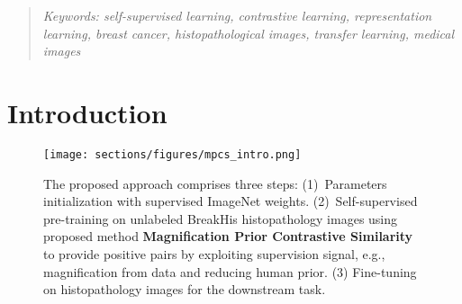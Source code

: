 \documentclass[conference]{IEEEtran}
\begin{document}
\begin{abstract}
\textit{Keywords: self-supervised learning, contrastive learning,  representation learning, breast cancer, histopathological images, transfer learning, medical images} \end{abstract}
\section{Introduction}


\begin{comment}


\begin{figure}
\centering
\begin{subfigure}{.49\columnwidth}
  \centering
\texttt{[image: sections/figures/40X.JPG]}  
  \caption{}
\end{subfigure}
\begin{subfigure}{.49\columnwidth}
  \centering
\texttt{[image: sections/figures/100X.JPG]}  
  \caption{}
\end{subfigure}
\newline
\begin{subfigure}{.49\columnwidth}
  \centering
\texttt{[image: sections/figures/200X.JPG]}  
  \caption{}
\end{subfigure}
\begin{subfigure}{.49\columnwidth}
  \centering
\texttt{[image: sections/figures/400X.JPG]}  
  \caption{}
\end{subfigure}
\caption{A slide of malignant tumor of BreakHis dataset seen in different magnification: (a) 40X, (b) 100X, (c) 200X, and (d) 400X}
\label{fig:fig_breakHis_intro}
\end{figure}

\end{comment}

\begin{figure}[!ht]
    \centering
    \texttt{[image: sections/figures/mpcs\_intro.png]}
    \vspace{-0.6cm}
    \caption{The proposed approach comprises three steps: (1)~Parameters initialization with supervised ImageNet weights. (2)~Self-supervised pre-training on unlabeled BreakHis histopathology images using proposed method \textbf{Magnification Prior Contrastive Similarity} to provide positive pairs by exploiting supervision signal, e.g., magnification from data and reducing human prior. (3) Fine-tuning on histopathology images for the downstream task.}
    \label{fig:mpcs_intro}
    \vspace{-6mm}
\end{figure}
\end{document}
